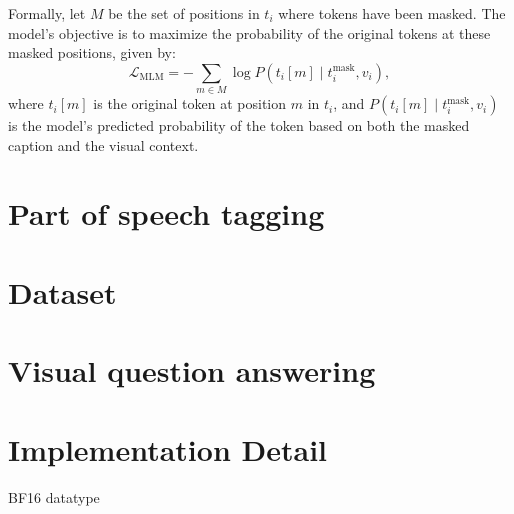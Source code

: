 Formally, let \(M\) be the set of positions in \(t_i\) where tokens have been masked. 
The model’s objective is to maximize the probability of the original tokens at these masked positions, given by:
\[
\mathcal{L}_{\text{MLM}} = - \sum_{m \in M} \log P\left(t_i[m] \mid t_i^{\text{mask}}, v_i\right),
\]
where \(t_i[m]\) is the original token at position \(m\) in \(t_i\), and \(P(t_i[m] \mid t_i^{\text{mask}}, v_i)\) is the model's predicted probability of the token based on both the masked caption and the visual context. 



\section{Part of speech tagging}


\section{Dataset}


\section{Visual question answering}


\section{Implementation Detail}
BF16 datatype